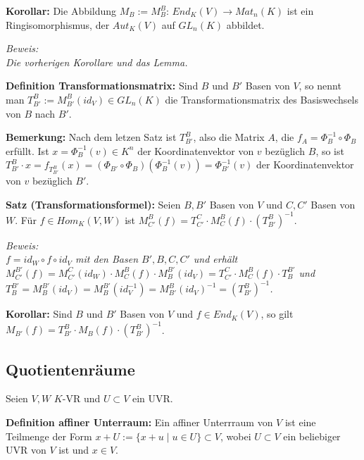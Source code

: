 \documentclass[11pt]{article}
\begin{document}
		\begin{framed}
			\textbf{Korollar:} Die Abbildung $M_B:=M_B^B$: $End_K(V)\to Mat_n(K)$ ist ein Ringisomorphismus, der $Aut_K(V)$ auf 
			$GL_n(K)$ abbildet.
		\end{framed}
		\textit{Beweis: \\
		Die vorherigen Korollare und das Lemma.} \\
		
		\begin{mdframed}[backgroundcolor=blue!20]
			\textbf{Definition Transformationsmatrix:} Sind $B$ und $B'$ Basen von $V$, so nennt man $T_{B'}^B:=M_{B'}^B(id_V)\in 
			GL_n(K)$ die Transformationsmatrix des Basiswechsels von $B$ nach $B'$.
		\end{mdframed}
		
		\textbf{Bemerkung:} Nach dem letzen Satz ist $T_{B'}^B$, also die Matrix $A$, die $f_A=\Phi_B^{-1}\circ \Phi_B$ 
		erfüllt. Ist $x=\Phi_B^{-1}(v)\in K^n$ der Koordinatenvektor von $v$ bezüglich $B$, so ist $T_{B'}^B\cdot 
		x=f_{T_{B'}^B}(x)=(\Phi_{B'}\circ \Phi_B)(\Phi_B^{-1}(v))=\Phi_{B'}^{-1}(v)$ der Koordinatenvektor von $v$ 
		bezüglich $B'$. \\
		
		\begin{mdframed}[backgroundcolor=blue!20]
			\textbf{Satz (Transformationsformel):} Seien $B,B'$ Basen von $V$ und $C,C'$ Basen von $W$. Für $f\in Hom_K(V,W)$ ist 
			$M_{C'}^B(f)=T_{C'}^C\cdot M_C^B(f)\cdot (T_{B'}^B)^{-1}$.
		\end{mdframed}
		\textit{Beweis: \\
		$f=id_W\circ f \circ id_V$ mit den Basen $B',B,C,C'$ und erhält $M_{C'}^{B'}(f)=M_{C'}^C(id_W)\cdot M_C^B(f)\cdot
		M_B^{B'}(id_V)=T_{C'}^C\cdot M_C^B(f)\cdot T_B^{B'}$ und $T_B^{B'}=M_B^{B'}(id_V)=M_B^{B'}(id_V^{-1})=M_{B'}^B(id_V)^
		{-1}=(T_{B'}^B)^{-1}$.} \\
		
		\begin{framed}
			\textbf{Korollar:} Sind $B$ und $B'$ Basen von $V$ und $f\in End_K(V)$, so gilt $M_{B'}(f)=T_{B'}^B \cdot M_B(f)
			\cdot (T_{B'}^B)^{-1}$.
		\end{framed}
		
	\subsection{Quotientenräume}
		Seien $V,W$ $K$-VR und $U\subset V$ ein UVR.
		
		\begin{mdframed}[backgroundcolor=blue!20]
			\textbf{Definition affiner Unterraum:} Ein affiner Unterrraum von $V$ ist eine Teilmenge der Form $x+U:=\{x+u\mid u \in U\}\subset 
			V$, wobei $U\subset V$ ein beliebiger UVR von $V$ ist und $x\in V$.
		\end{mdframed}
		
\end{document}
